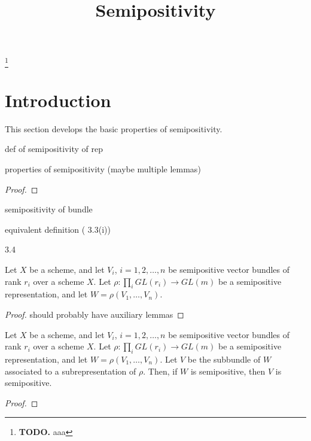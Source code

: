 


\newcommand{\todo}[1]{\footnote{\textbf{TODO.} #1}}

\title{Semipositivity}
\maketitle

\todo{aaa}


\section{Introduction}
This section develops the basic properties of semipositivity.


\begin{definition}
def of semipositivity of rep
\end{definition}

\begin{lemma}
properties of semipositivity (maybe multiple lemmas)
\end{lemma}


\begin{proof}

\end{proof}


\begin{definition}
semipositivity of bundle
\end{definition}

\begin{lemma}
equivalent definition ( 3.3(i))
\end{lemma}

\begin{lemma}
3.4
\end{lemma}

\begin{lemma}
Let $X$ be a scheme, and let $V_i$, $i=1,2,\ldots,n$ be semipositive vector bundles of rank $r_i$ over a scheme $X$. Let $\rho:\prod_i GL(r_i)\to GL(m)$ be a semipositive representation, and let $W=\rho(V_1,\ldots,V_n)$. 
\end{lemma}

\begin{proof}
should probably have auxiliary lemmas
\end{proof}

\begin{lemma}
Let $X$ be a scheme, and let $V_i$, $i=1,2,\ldots,n$ be semipositive vector bundles of rank $r_i$ over a scheme $X$. Let $\rho:\prod_i GL(r_i)\to GL(m)$ be a semipositive representation, and let $W=\rho(V_1,\ldots,V_n)$. Let $V$ be the subbundle of $W$ associated to a subrepresentation of $\rho$. Then, if $W$ is semipositive, then $V$ is semipositive.
\end{lemma}

\begin{proof}

\end{proof}







